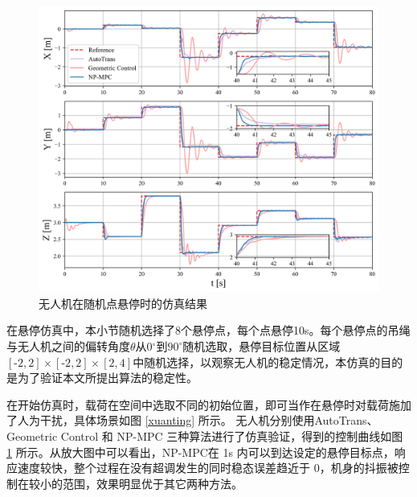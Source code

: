 \documentclass[lang=chs, degree=master, blindreview=false, winfonts=true]{yanputhesis}
\begin{document}
\begin{figure}[hbt!]
	\centering
	\includegraphics[width=33pc]{picture/kk/comparision.png} 
	\vspace{-0.2cm}
	\caption{无人机在随机点悬停时的仿真结果} 
	\label{comparision}
\end{figure}

在悬停仿真中，本小节随机选择了8个悬停点，每个点悬停10s。每个悬停点的吊绳与无人机之间的偏转角度$\theta$从0$^\circ$到$\text{90}^\circ$随机选取，悬停目标位置从区域$[\text{-2}, \text{2}] \times [\text{-2}, \text{2}] \times [\text{2}, \text{4}]$中随机选择，以观察无人机的稳定情况，本仿真的目的是为了验证本文所提出算法的稳定性。



在开始仿真时，载荷在空间中选取不同的初始位置，即可当作在悬停时对载荷施加了人为干扰，具体场景如图 \ref{xuanting} 所示。
无人机分别使用AutoTrans、Geometric Control 和 NP-MPC 三种算法进行了仿真验证，得到的控制曲线如图 \ref{comparision} 所示。从放大图中可以看出，NP-MPC在 1s 内可以到达设定的悬停目标点，响应速度较快，整个过程在没有超调发生的同时稳态误差趋近于 0，机身的抖振被控制在较小的范围，效果明显优于其它两种方法。
\end{document}
